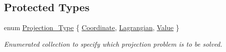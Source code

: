 \subsection*{Protected Types}
\begin{DoxyCompactItemize}
\item 
enum \hyperlink{classoomph_1_1ProjectableElementBase_aa6b28955725b5626cc4cbf0465f12a9e}{Projection\+\_\+\+Type} \{ \hyperlink{classoomph_1_1ProjectableElementBase_aa6b28955725b5626cc4cbf0465f12a9eab653154bbbdee655a7f9a666a971b614}{Coordinate}, 
\hyperlink{classoomph_1_1ProjectableElementBase_aa6b28955725b5626cc4cbf0465f12a9ea9e3decdba764ce2f6c3155676d44e38e}{Lagrangian}, 
\hyperlink{classoomph_1_1ProjectableElementBase_aa6b28955725b5626cc4cbf0465f12a9ea7923f87012a0224d8a68656e58c5474a}{Value}
 \}\begin{DoxyCompactList}\small\item\em Enumerated collection to specify which projection problem is to be solved. \end{DoxyCompactList}
\end{DoxyCompactItemize}

